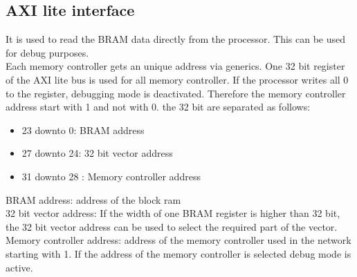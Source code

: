 \subsection{AXI lite interface}
It is used to read the BRAM data directly from the processor. This can be used for debug purposes. \\
Each memory controller gets an unique address via generics. 
One 32 bit register of the AXI lite bus is used for all memory controller. 
If the processor writes all 0 to the register, debugging mode is deactivated. 
Therefore the memory controller address start with 1 and not with 0.
the 32 bit are separated as follows: \\
\begin{itemize}
	\item 23 downto 0: BRAM address
	\item 27 downto 24: 32 bit vector address 
	\item 31 downto 28 : Memory controller address 
\end{itemize}  
BRAM address: address of the block ram \\
32 bit vector address: If the width of one BRAM register is higher than 32 bit, the 32 bit vector address can be used to select the required part of the vector. \\
Memory controller address: address of the memory controller used in the network starting with 1. If the address of the memory controller is selected debug mode is active. \\

 